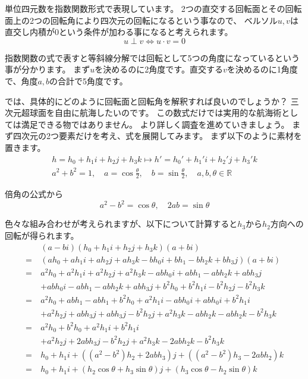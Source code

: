 \documentclass[a4paper,12pt]{jsreport}
\begin{document}
単位四元数を指数関数形式で表現しています。
2つの直交する回転面とその回転面上の2つの回転角により四次元の回転になるという事なので、
ベルソル$u,v$は直交し内積が$0$という条件が加わる事になると考えられます。
\begin{equation}
u \perp v \iff u \cdot v=0
\end{equation}

指数関数の式で表すと等斜線分解では回転として5つの角度になっているという事が分かります。
まず$u$を決めるのに2角度です。直交する$v$を決めるのに1角度で、角度$a,b$の合計で5角度です。

では、具体的にどのように回転面と回転角を解釈すれば良いのでしょうか？
三次元超球面を自由に航海したいのです。
この数式だけでは実用的な航海術としては満足できる物ではありません。
より詳しく調査を進めていきましょう。
まず四次元の2つ要素だけを考え、式を展開してみます。
まず以下のように素材を置きます。
\begin{gather}
h=h_0+h_1i+h_2j+h_3k \mapsto h'=h_0'+h_1'i+h_2'j+h_3'k\\
a^2+b^2=1,\quad a=\cos\frac{\theta}{2},\quad b=\sin\frac{\theta}{2},
\quad a,b,\theta\in\mathbb{R}
\end{gather}

倍角の公式から
\begin{equation}
a^2-b^2=\cos\theta,\quad 2ab=\sin\theta
\end{equation}

色々な組み合わせが考えられますが、以下について計算すると$h_3$から$h_2$方向への回転が得られます。
\begin{equation}
\begin{split}
&(a-bi)(h_0+h_1i+h_2j+h_3k)(a+bi)\\
=~&(ah_0+ah_1i+ah_2j+ah_3k-bh_0i+bh_1-bh_2k+bh_3j)(a+bi)\\
=~&a^2h_0+a^2h_1i+a^2h_2j+a^2h_3k-abh_0i+abh_1-abh_2k+abh_3j\\
&+abh_0i-abh_1-abh_2k+abh_3j+b^2h_0+b^2h_1i-b^2h_2j-b^2h_3k\\
=~&a^2h_0+abh_1-abh_1+b^2h_0+a^2h_1i-abh_0i+abh_0i+b^2h_1i\\
&+a^2h_2j+abh_3j+abh_3j-b^2h_2j+a^2h_3k-abh_2k-abh_2k-b^2h_3k\\
=~&a^2h_0+b^2h_0+a^2h_1i+b^2h_1i\\
&+a^2h_2j+2abh_3j-b^2h_2j+a^2h_3k-2abh_2k-b^2h_3k\\
=~&h_0+h_1i+((a^2-b^2)h_2+2abh_3)j+((a^2-b^2)h_3-2abh_2)k\\
=~&h_0+h_1i+(h_2\cos\theta+h_3\sin\theta)j+(h_3\cos\theta-h_2\sin\theta)k
\end{split}
\end{equation}
\end{document}
